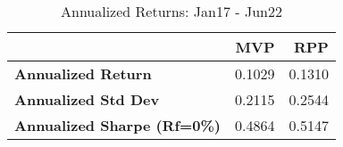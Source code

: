 \begin{table}
      \centering
      \begingroup
      \fontsize{9}{9}
      \selectfont 
\begin{tabular}{>{}lrr}
\toprule
  & MVP & RPP\\
\midrule
\textbf{Annualized Return} & 0.1029 & 0.1310\\
\textbf{Annualized Std Dev} & 0.2115 & 0.2544\\
\textbf{Annualized Sharpe (Rf=0\%)} & 0.4864 & 0.5147\\
\bottomrule
\end{tabular} \caption{Annualized Returns: Jan17 - Jun22}
      \label{tab: HighLow }  
      \endgroup{}
      \end{table}